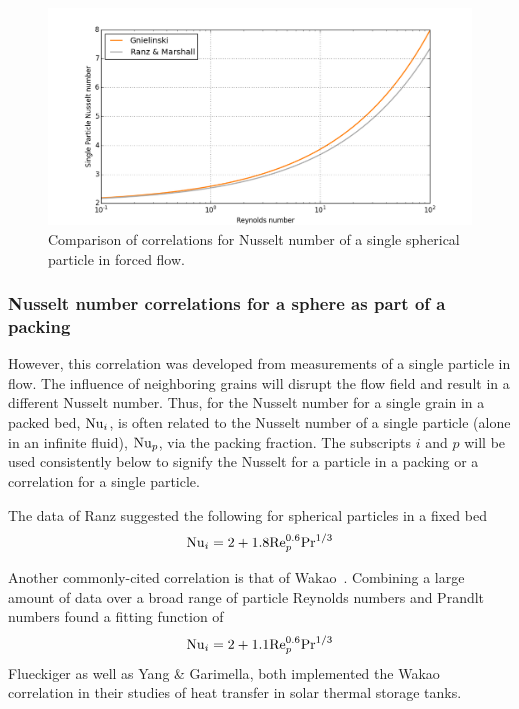 \begin{figure}[!h]
    \centering
    \includegraphics[width=\singleimagewidth]{figures/Nusselt-single}
    \caption{Comparison of correlations for Nusselt number of a single spherical particle in forced flow.}
    \label{fig:Nu-single}
\end{figure}





\subsubsection{Nusselt number correlations for a sphere as part of a packing}
However, this correlation was developed from measurements of a single particle in flow. The influence of neighboring grains will disrupt the flow field and result in a different Nusselt number. Thus, for the Nusselt number for a single grain in a packed bed, $\mathrm{Nu}_i$, is often related to the Nusselt number of a single particle (alone in an infinite fluid), $\mathrm{Nu}_p$, via the packing fraction. The subscripts $i$ and $p$ will be used consistently below to signify the Nusselt for a particle in a packing or a correlation for a single particle. 

The data of Ranz suggested the following for spherical particles in a fixed bed
\begin{equation}\label{eq:ranz-packing}
    \mathrm{Nu}_i = 2 + 1.8\mathrm{Re}_p^{0.6} \mathrm{Pr}^{1/3}
\end{equation}

Another commonly-cited correlation is that of Wakao\etal~\cite{Wakao1978,wakao1982heat}. Combining a large amount of data over a broad range of particle Reynolds numbers and Prandlt numbers found a fitting function of
\begin{equation}\label{eq:wakao}
    \mathrm{Nu}_i = 2 + 1.1\mathrm{Re}_p^{0.6} \mathrm{Pr}^{1/3}
\end{equation}
Flueckiger\etal \cite{Flueckiger2014,Flueckiger2011a,Flueckiger2011} as well as Yang \& Garimella\cite{Yang2010}, both implemented the Wakao\etal~ correlation in their studies of heat transfer in solar thermal storage tanks. 

